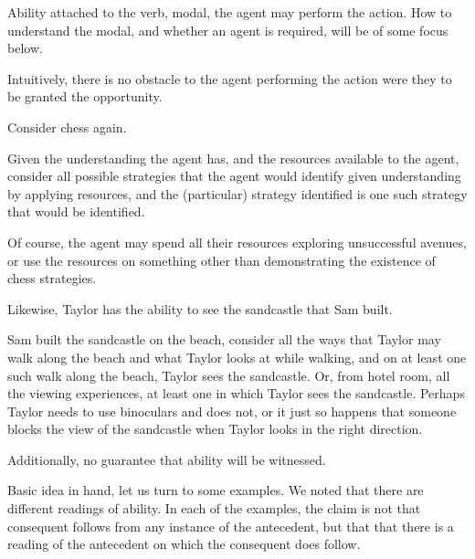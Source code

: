 \begin{note}
  Ability attached to the verb, modal, the agent may perform the action.
  How to understand the modal, and whether an agent is required, will be of some focus below.

  Intuitively, there is no obstacle to the agent performing the action were they to be granted the opportunity.

  Consider chess again.

  Given the understanding the agent has, and the resources available to the agent, consider all possible strategies that the agent would identify given understanding by applying resources, and the (particular) strategy identified is one such strategy that would be identified.

  Of course, the agent may spend all their resources exploring unsuccessful avenues, or use the resources on something other than demonstrating the existence of chess strategies.

  Likewise, Taylor has the ability to see the sandcastle that Sam built.

  Sam built the sandcastle on the beach, consider all the ways that Taylor may walk along the beach and what Taylor looks at while walking, and on at least one such walk along the beach, Taylor sees the sandcastle.
  Or, from hotel room, all the viewing experiences, at least one in which Taylor sees the sandcastle.
  Perhaps Taylor needs to use binoculars and does not, or it just so happens that someone blocks the view of the sandcastle when Taylor looks in the right direction.

  {\color{red}
    Additionally, no guarantee that ability will be witnessed.
  }
\end{note}

\begin{note}
  Basic idea in hand, let us turn to some examples.
  We noted that there are different readings of ability.
  In each of the examples, the claim is not that consequent follows from any instance of the antecedent, but that that there is a reading of the antecedent on which the consequent does follow.
\end{note}

